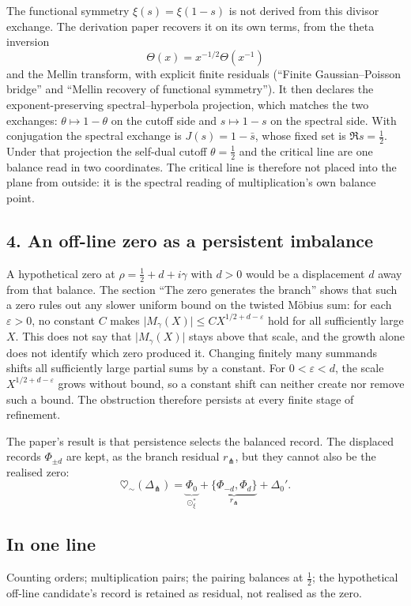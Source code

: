 \documentclass[11pt]{article}
\newcommand{\heartsim}{\heartsuit_{\sim}}
\newcommand{\DeltaFork}{\Delta_{\pitchfork}}
\begin{document}
The functional symmetry \(\xi(s)=\xi(1-s)\) is not derived from this divisor exchange. The derivation paper recovers it on its own terms, from the theta inversion
\[
\Theta(x)=x^{-1/2}\Theta(x^{-1})
\]
and the Mellin transform, with explicit finite residuals (``Finite Gaussian--Poisson bridge'' and ``Mellin recovery of functional symmetry''). It then declares the exponent-preserving spectral--hyperbola projection, which matches the two exchanges: \(\theta\mapsto1-\theta\) on the cutoff side and \(s\mapsto1-s\) on the spectral side. With conjugation the spectral exchange is \(J(s)=1-\bar s\), whose fixed set is \(\Re s=\tfrac12\). Under that projection the self-dual cutoff \(\theta=\tfrac12\) and the critical line are one balance read in two coordinates. The critical line is therefore not placed into the plane from outside: it is the spectral reading of multiplication's own balance point.

\subsection*{4. An off-line zero as a persistent imbalance}

A hypothetical zero at \(\rho=\tfrac12+d+i\gamma\) with \(d>0\) would be a displacement \(d\) away from that balance. The section ``The zero generates the branch'' shows that such a zero rules out any slower uniform bound on the twisted M\"obius sum: for each \(\varepsilon>0\), no constant \(C\) makes \(\lvert M_\gamma(X)\rvert\le C X^{1/2+d-\varepsilon}\) hold for all sufficiently large \(X\). This does not say that \(\lvert M_\gamma(X)\rvert\) stays above that scale, and the growth alone does not identify which zero produced it. Changing finitely many summands shifts all sufficiently large partial sums by a constant. For \(0<\varepsilon<d\), the scale \(X^{1/2+d-\varepsilon}\) grows without bound, so a constant shift can neither create nor remove such a bound. The obstruction therefore persists at every finite stage of refinement.

The paper's result is that persistence selects the balanced record. The displaced records \(\Phi_{\pm d}\) are kept, as the branch residual \(r_{\pitchfork}\), but they cannot also be the realised zero:
\[
\heartsim(\DeltaFork)
=
\underbrace{\Phi_0}_{\odot_\xi^\ast}
+
\underbrace{\{\Phi_{-d},\Phi_d\}}_{r_{\pitchfork}}
+
\Delta_0'.
\]

\subsection*{In one line}

Counting orders; multiplication pairs; the pairing balances at \(\tfrac12\); the hypothetical off-line candidate's record is retained as residual, not realised as the zero.
\end{document}
